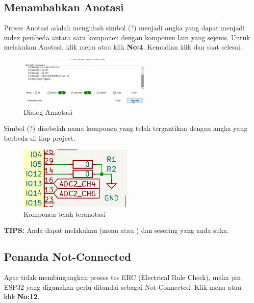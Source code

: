 \documentclass[12pt]{book}
\begin{document}
	\subsection{Menambahkan Anotasi}

	Proses Anotasi adalah mengubah simbol (?) menjadi angka yang dapat menjadi index pembeda antara
	satu komponen dengan komponen lain yang sejenis.
	Untuk melakukan Anotasi, klik menu  atau klik \textbf{No:4}.
	Kemudian klik  dan  saat selesai.

	\begin{figure}[!ht]
		\centering
		\includegraphics[width=0.6\textwidth]{images/sch/sch_15}
		\caption{Dialog Annotasi}
	\end{figure}

	Simbol (?) disebelah nama komponen yang telah tergantikan dengan angka yang berbeda di tiap project.

	\begin{figure}[!ht]
		\centering
		\includegraphics[width=0.5\textwidth]{images/sch/sch_16}
		\caption{Komponen telah teranotasi}
	\end{figure}

	\textbf{TIPS:} Anda dapat melakukan  (menu  atau ) dan  sesering yang anda suka.

	\newpage
	\subsection{Penanda Not-Connected}

	Agar tidak membingungkan proses tes ERC (Electrical Rule Check), maka pin ESP32 yang digunakan perlu ditandai sebagai Not-Connected.
	Klik menu  atau klik \textbf{No:12}.\\
\end{document}
